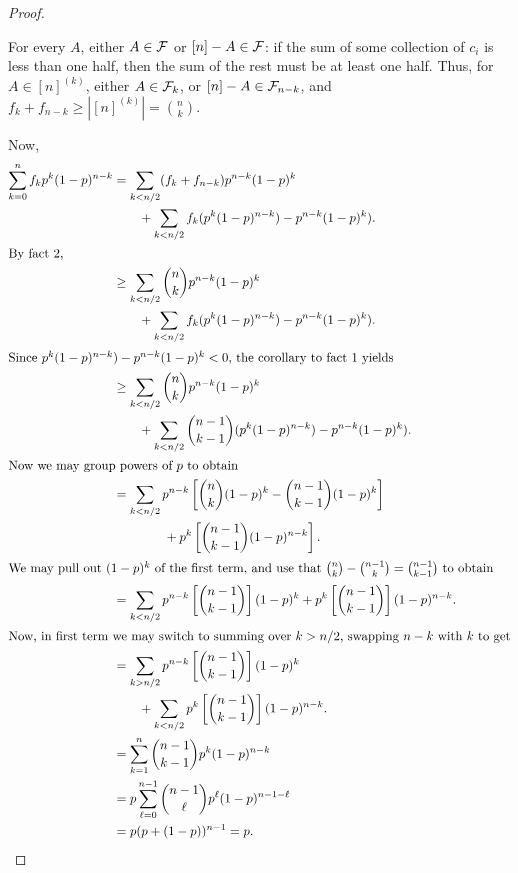 \begin{proof}
\begin{enumerate}[{Fact }1.]
	\begin{subproof}
	For every $A$, either $A\in \mathcal{F}$ or $[n]- A \in \mathcal{F}$: if the sum of some collection of $c_i$ is less than one half, then the sum of the rest must be at least one half. Thus, for $A\in [n]^{(k)}$, either $A\in \mathcal{F}_k$, or $[n]- A\in \mathcal{F}_{n-k}$, and $f_k + f_{n-k} \geq |[n]^{(k)}| = {n\choose k}$.
	\end{subproof}
\end{enumerate}
Now, 
\begin{align*}	
\sum_{k=0}^n f_k p^k (1-p)^{n-k}&= \sum_{k<n/2} (f_k + f_{n-k}) p^{n-k}(1-p)^k \\
&\qquad+ \sum_{k< n/2}  f_k ( p^k (1-p)^{n-k}) - p^{n-k}(1-p)^k).\\
\intertext{By fact 2,}
&\geq \sum_{k<n/2}{n\choose k} p^{n-k}(1-p)^k \\
&\qquad+ \sum_{k< n/2}  f_k ( p^k (1-p)^{n-k}) - p^{n-k}(1-p)^k).\\
\intertext{Since $ p^k (1-p)^{n-k}) - p^{n-k}(1-p)^k < 0$,  the corollary to fact 1 yields}
&\geq \sum_{k<n/2} {n\choose k}p^{n-k}(1-p)^k \\
&\qquad+ \sum_{k< n/2}  {n-1\choose k-1}( p^k (1-p)^{n-k}) - p^{n-k}(1-p)^k). \\
\intertext{Now we may group powers of $p$ to obtain}
&= \sum_{k<n/2} p^{n-k} \left[ {n\choose k}(1-p)^k - {n-1 \choose k-1}(1-p)^k  \right] \\
&\qquad\qquad +p^k \left[ {n-1\choose k-1}(1-p)^{n-k} \right].\\
\intertext{We may pull out $(1-p)^k$ of the first term, and use that ${n\choose k}- {n-1 \choose k}={n-1\choose k-1}$ to obtain}
&= \sum_{k<n/2} p^{n-k} \left[ {n-1\choose k-1}   \right](1-p)^k + p^k \left[ {n-1\choose k-1} \right](1-p)^{n-k}.\\
\intertext{Now, in first term we may switch to summing over $k>n/2$, swapping $n-k$ with $k$ to get}
&= \sum_{k>n/2} p^{n-k} \left[ {n-1\choose k-1}   \right](1-p)^k \\
&\qquad+\sum_{k<n/2} p^k \left[ {n-1\choose k-1} \right](1-p)^{n-k}.\\
&=\sum_{k=1}^n {n-1 \choose k-1} p^k (1-p)^{n-k}\\
&= p \sum_{\ell=0}^{n-1} {n-1 \choose \ell} p^\ell (1-p)^{n-1-\ell} \\
&= p( p + (1-p))^{n-1} =p. \qedhere 
\end{align*}
\end{proof}